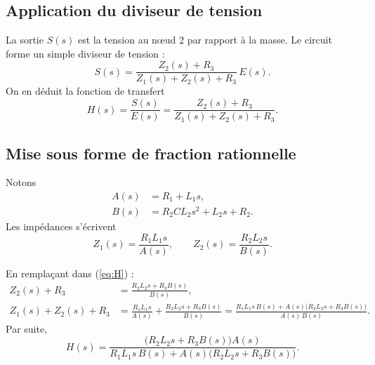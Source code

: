 \documentclass[12pt,a4paper]{article}
\begin{document}
\subsection{Application du diviseur de tension}
La sortie \(S(s)\) est la tension au nœud 2 par rapport à la masse. Le circuit forme un simple diviseur de tension :
\begin{equation}
S(s) = \frac{Z_2(s) + R_3}{Z_1(s) + Z_2(s) + R_3} \, E(s) .
\label{eq:diviseur}
\end{equation}
On en déduit la fonction de transfert
\begin{equation}
\boxed{H(s) = \frac{S(s)}{E(s)} = \frac{Z_2(s) + R_3}{Z_1(s) + Z_2(s) + R_3}} .
\label{eq:H}
\end{equation}

\subsection{Mise sous forme de fraction rationnelle}
Notons
\begin{align}
A(s) &= R_1 + L_1 s , \label{eq:A}\\
B(s) &= R_2 C L_2 s^2 + L_2 s + R_2 . \label{eq:B}
\end{align}
Les impédances s'écrivent
\[
Z_1(s) = \frac{R_1 L_1 s}{A(s)} , \qquad
Z_2(s) = \frac{R_2 L_2 s}{B(s)} .
\]

En remplaçant dans (\ref{eq:H}) :
\begin{align}
Z_2(s) + R_3 &= \frac{R_2 L_2 s + R_3 B(s)}{B(s)} ,\\
Z_1(s) + Z_2(s) + R_3 &= \frac{R_1 L_1 s}{A(s)} + \frac{R_2 L_2 s + R_3 B(s)}{B(s)}
 = \frac{R_1 L_1 s\,B(s) + A(s)\bigl(R_2 L_2 s + R_3 B(s)\bigr)}{A(s)\,B(s)} .
\end{align}
Par suite,
\begin{equation}
H(s) = \frac{\bigl(R_2 L_2 s + R_3 B(s)\bigr) A(s)}{R_1 L_1 s\,B(s) + A(s)\bigl(R_2 L_2 s + R_3 B(s)\bigr)} .
\label{eq:Hfrac}
\end{equation}
\end{document}
